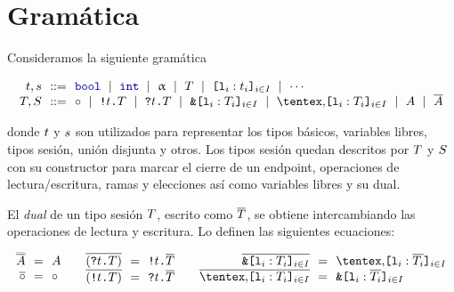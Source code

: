 \section{Gramática}

Consideramos la siguiente gramática

\[
\begin{array}{@{}r@{~~}c@{~~}l@{}}
\TypeT, \TypeS & ::= &
\tbool
\rulemid \tint
\rulemid \tvar
\rulemid \SessionType
\rulemid \set[i\in I]{ \Tag_i : \Type_i }
\rulemid \cdots
\\
\SessionTypeT, \SessionTypeS & ::= &
\tend
\rulemid \Out\Type\SessionType
\rulemid \In\Type\SessionType
\rulemid \Branch \set[i\in I]{\Tag_i : \SessionType_i}
\rulemid \Choice \set[i\in I]{\Tag_i : \SessionType_i}
\rulemid \etvar
\rulemid \dual\etvar
\end{array}
\]

donde $t$ y $s$ son utilizados para representar los tipos básicos,
variables libres, tipos sesión, unión disjunta y otros.
Los tipos sesión quedan descritos por $T$ y $S$ con su
constructor para marcar el cierre de un endpoint, operaciones de
lectura/escritura, ramas y elecciones así como variables libres y su dual.

El \emph{dual} de un tipo sesión $T$, escrito como
$\overline{T}$, se obtiene intercambiando las operaciones de lectura y
escritura. Lo definen las siguientes ecuaciones:

\[
\begin{array}{c}
  \begin{array}{@{}r@{~~}c@{~~}l@{}}
    \smash{\dual{\dual\etvar}} & = & \etvar \\
    \dual\tend & = & \tend \\
  \end{array}
  \qquad
  \begin{array}{@{}r@{~~}c@{~~}l@{}}
    \dual{(\In\Type\SessionType)} & = & \Out\Type\dual\SessionType \\
    \dual{(\Out\Type\SessionType)} & = & \In\Type\dual\SessionType \\
  \end{array}
  \qquad
  \begin{array}{@{}r@{~~}c@{~~}l@{}}
    \dual{\Branch \set[i\in I]{\Tag_i : \SessionType_i}}
    & = & \Choice \set[i\in I]{\Tag_i : \dual{\SessionType_i}} \\
    \dual{\Choice \set[i\in I]{\Tag_i : \SessionType_i}}
    & = & \Branch \set[i\in I]{\Tag_i : \dual{\SessionType_i}} \\
  \end{array}
\end{array}
\]

